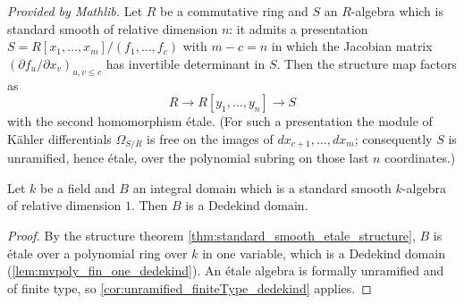 \begin{theorem}
  \label{thm:standard_smooth_etale_structure}
  \mathlibok
  \textit{Provided by Mathlib.}
  Let \(R\) be a commutative ring and \(S\) an \(R\)-algebra which is standard smooth of
  relative dimension \(n\): it admits a presentation
  \(S = R[x_1,\dots,x_m]/(f_1,\dots,f_c)\) with \(m - c = n\) in which the Jacobian matrix
  \((\partial f_u/\partial x_v)_{u,v \le c}\) has invertible determinant in \(S\). Then the
  structure map factors as
  \[
    R \longrightarrow R[y_1, \dots, y_n] \longrightarrow S
  \]
  with the second homomorphism \'etale. (For such a presentation the module of K\"ahler
  differentials \(\Omega_{S/R}\) is free on the images of
  \(dx_{c+1}, \dots, dx_m\); consequently \(S\) is unramified, hence \'etale, over the
  polynomial subring on those last \(n\) coordinates.)
\end{theorem}

\begin{theorem}
  \label{thm:standard_smooth_dim_one_dedekind}
  \leanok
  Let \(k\) be a field and \(B\) an integral domain which is a standard smooth
  \(k\)-algebra of relative dimension \(1\). Then \(B\) is a Dedekind domain.
\end{theorem}
\begin{proof}
  \leanok
  By the structure theorem \ref{thm:standard_smooth_etale_structure}, \(B\) is \'etale over
  a polynomial ring over \(k\) in one variable, which is a Dedekind domain
  (\ref{lem:mvpoly_fin_one_dedekind}). An \'etale algebra is formally unramified and of
  finite type, so \ref{cor:unramified_finiteType_dedekind} applies.
\end{proof}

